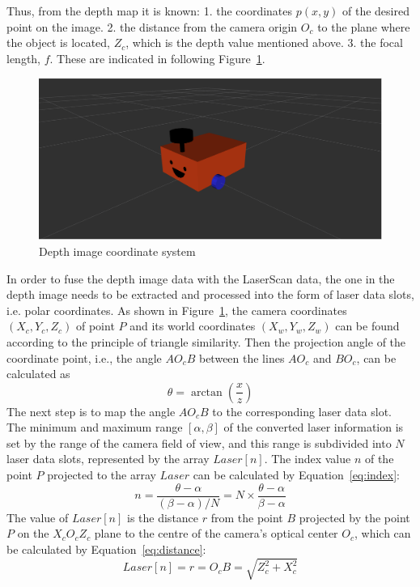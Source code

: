 Thus, from the depth map it is known: 
1. the coordinates $p(x, y)$ of the desired point on the image. 
2. the distance from the camera origin $O_c$ to the plane where the object is located, $Z_c$, which is the depth value mentioned above. 
3. the focal length, $f$. These are indicated in following Figure~\ref{fig:depth_coordinate}.
\begin{figure}[H]
    \centering
    \includegraphics[width=0.8\linewidth]{figs/robot.png}
    \caption{Depth image coordinate system}
    \label{fig:depth_coordinate}
\end{figure}
In order to fuse the depth image data with the LaserScan data, 
the one in the depth image needs to be extracted and processed into the form of laser data slots, i.e. polar coordinates. 
As shown in Figure~\ref{fig:depth_coordinate}, the camera coordinates $(X_c, Y_c, Z_c)$ of point $P$ and its world coordinates $(X_w, Y_w, Z_w)$ 
can be found according to the principle of triangle similarity. 
Then the projection angle of the coordinate point, i.e., the angle $AO_cB$ between the lines $AO_c$ and $BO_c$, can be calculated as 
\begin{equation}
    \theta=\arctan{(\frac{x}{z})}
\end{equation}
The next step is to map the angle $AO_cB$ to the corresponding laser data slot. 
The minimum and maximum range $[\alpha, \beta]$ of the converted laser information is set by the range of the camera field of view, 
and this range is subdivided into $N$ laser data slots, represented by the array $Laser[n]$. 
The index value $n$ of the point $P$ projected to the array $Laser$ can be calculated by Equation~\ref{eq:index}:
\begin{equation}
    n=\frac{\theta-\alpha}{(\beta-\alpha)/N}=N\times\frac{\theta-\alpha}{\beta-\alpha}
    \label{eq:index}
\end{equation}
The value of $Laser[n]$ is the distance $r$ from the point $B$ projected 
by the point $P$ on the $X_cO_cZ_c$ plane to the centre of the camera's optical center $O_c$, 
which can be calculated by Equation~\ref{eq:distance}:
\begin{equation}
    Laser[n]=r=O_cB=\sqrt{Z_c^2+X_c^2}
    \label{eq:distance}
\end{equation}

